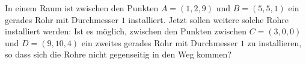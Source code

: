 In einem Raum ist zwischen den Punkten $A=(1,2,9)$ und $B=(5,5,1)$
ein gerades Rohr mit Durchmesser $1$ installiert.
Jetzt sollen weitere solche Rohre installiert werden:
Ist es möglich, zwischen den Punkten zwischen $C=(3,0,0)$ und $D=(9,10,4)$
ein zweites gerades Rohr mit Durchmesser $1$ zu installieren, so dass sich
die Rohre nicht gegenseitig in den Weg kommen?

